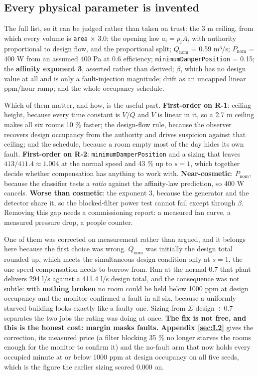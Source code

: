 \subsection{Every physical parameter is invented}\label{sec:13.3}

The full list, so it can be judged rather than taken on trust: the 3 m ceiling, from which every
volume is \texttt{area} $\times$ 3.0; the opening law $a_i = p_i A_i$ with authority proportional to
design flow, and the proportional split; $Q_\text{nom}$ = 0.59 m³/s; $P_\text{nom}$ = 400 W from an
assumed 400 Pa at 0.6 efficiency; \texttt{minimumDamperPosition} = 0.15; the \textbf{affinity
exponent 3}, asserted rather than derived; $\beta$, which has no design value at all and is only a
fault-injection magnitude; drift as an uncapped linear ppm/hour ramp; and the whole occupancy
schedule.

Which of them matter, and how, is the useful part. \textbf{First-order on R-1}: ceiling height,
because every time constant is $V/Q$ and $V$ is linear in it, so a 2.7 m ceiling makes all six rooms
10 \% faster; the design-flow rule, because the observer recovers design occupancy from the
authority and drives suspicion against that ceiling; and the schedule, because a room empty most of
the day hides its own fault. \textbf{First-order on R-2}: \texttt{minimumDamperPosition} and a
sizing that leaves $413/411.4 \approx 1.004$ at the normal speed and 43 \% up to $s=1$, which
together decide whether compensation has anything to work with. \textbf{Near-cosmetic}: $P_\text{nom}$, because the classifier tests a \emph{ratio}
against the affinity-law prediction, so 400 W cancels. \textbf{Worse than cosmetic}: the exponent
3, because the generator and the detector share it, so the blocked-filter power test cannot fail
except through $\beta$. Removing this gap needs a commissioning report: a measured fan curve, a
measured pressure drop, a people counter.

One of them was corrected on measurement rather than argued, and it belongs here because the first
choice was wrong. $Q_\text{nom}$ was initially the design total rounded up, which meets the
simultaneous design condition only at $s=1$, the one speed compensation needs to borrow from. Run
at the normal 0.7 that plant delivers 294 l/s against a 411.4 l/s design total, and the consequence
was not subtle: with \textbf{nothing broken} no room could be held below 1000 ppm at design occupancy
and the monitor confirmed a fault in all six, because a uniformly starved building looks exactly like
a faulty one. Sizing from $\Sigma$ design $\div\ 0.7$ separates the two jobs the rating was doing at
once. \textbf{The fix is not free, and this is the honest cost: margin masks faults.}
\textbf{Appendix \ref{sec:I.2}} gives the correction, its measured price (a filter blocking 35 \% no longer
starves the rooms enough for the monitor to confirm it) and the no-fault arm that now holds every
occupied minute at or below 1000 ppm at design occupancy on all five seeds, which is the figure the
earlier sizing scored 0.000 on.
